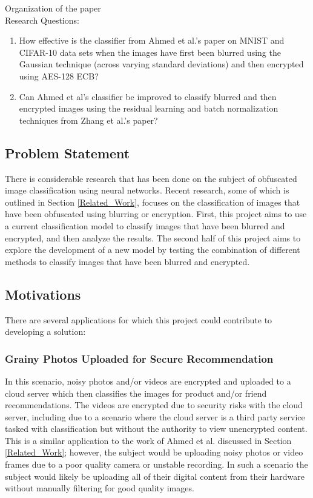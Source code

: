 \documentclass[12pt, titlepage]{article}
\begin{document}
Organization of the paper\\

Research Questions:
\begin{enumerate}
	\item How effective is the classifier from Ahmed et al.'s paper on MNIST and CIFAR-10 data sets when the images have first been blurred using the Gaussian technique (across varying standard deviations) and then encrypted using AES-128 ECB?
	\item Can Ahmed et al's classifier be improved to classify blurred and then encrypted images using the residual learning and batch normalization techniques from Zhang et al.'s paper?
\end{enumerate}

\subsection{Problem Statement}\label{ps}
There is considerable research that has been done on the subject of obfuscated image classification using neural networks. Recent research, some of which is outlined in Section \ref{Related_Work}, focuses on the classification of images that have been obfuscated using blurring or encryption. First, this project aims to use a current classification model to classify images that have been blurred and encrypted, and then analyze the results. The second half of this project aims to explore the development of a new model by testing the combination of different methods to classify images that have been blurred and encrypted.

\subsection{Motivations}\label{motivations}
There are several applications for which this project could contribute to developing a solution:

\subsubsection{Grainy Photos Uploaded for Secure Recommendation}
In this scenario, noisy photos and/or videos are encrypted and uploaded to a cloud server which then classifies the images for product and/or friend recommendations. The videos are encrypted due to security risks with the cloud server, including due to a scenario where the cloud server is a third party service tasked with classification but without the authority to view unencrypted content. This is a similar application to the work of Ahmed et al. discussed in Section \ref{Related_Work}; however, the subject would be uploading noisy photos or video frames due to a poor quality camera or unstable recording. In such a scenario the subject would likely be uploading all of their digital content from their hardware without manually filtering for good quality images.
\end{document}
